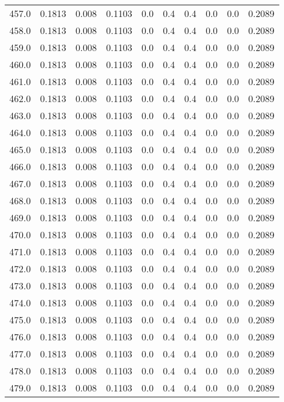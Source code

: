 \begin{longtable}{lrrrrrrrrr}
457.0 & 0.1813 & 0.008 & 0.1103 & 0.0 & 0.4 & 0.4 & 0.0 & 0.0 & 0.2089 \\
458.0 & 0.1813 & 0.008 & 0.1103 & 0.0 & 0.4 & 0.4 & 0.0 & 0.0 & 0.2089 \\
459.0 & 0.1813 & 0.008 & 0.1103 & 0.0 & 0.4 & 0.4 & 0.0 & 0.0 & 0.2089 \\
460.0 & 0.1813 & 0.008 & 0.1103 & 0.0 & 0.4 & 0.4 & 0.0 & 0.0 & 0.2089 \\
461.0 & 0.1813 & 0.008 & 0.1103 & 0.0 & 0.4 & 0.4 & 0.0 & 0.0 & 0.2089 \\
462.0 & 0.1813 & 0.008 & 0.1103 & 0.0 & 0.4 & 0.4 & 0.0 & 0.0 & 0.2089 \\
463.0 & 0.1813 & 0.008 & 0.1103 & 0.0 & 0.4 & 0.4 & 0.0 & 0.0 & 0.2089 \\
464.0 & 0.1813 & 0.008 & 0.1103 & 0.0 & 0.4 & 0.4 & 0.0 & 0.0 & 0.2089 \\
465.0 & 0.1813 & 0.008 & 0.1103 & 0.0 & 0.4 & 0.4 & 0.0 & 0.0 & 0.2089 \\
466.0 & 0.1813 & 0.008 & 0.1103 & 0.0 & 0.4 & 0.4 & 0.0 & 0.0 & 0.2089 \\
467.0 & 0.1813 & 0.008 & 0.1103 & 0.0 & 0.4 & 0.4 & 0.0 & 0.0 & 0.2089 \\
468.0 & 0.1813 & 0.008 & 0.1103 & 0.0 & 0.4 & 0.4 & 0.0 & 0.0 & 0.2089 \\
469.0 & 0.1813 & 0.008 & 0.1103 & 0.0 & 0.4 & 0.4 & 0.0 & 0.0 & 0.2089 \\
470.0 & 0.1813 & 0.008 & 0.1103 & 0.0 & 0.4 & 0.4 & 0.0 & 0.0 & 0.2089 \\
471.0 & 0.1813 & 0.008 & 0.1103 & 0.0 & 0.4 & 0.4 & 0.0 & 0.0 & 0.2089 \\
472.0 & 0.1813 & 0.008 & 0.1103 & 0.0 & 0.4 & 0.4 & 0.0 & 0.0 & 0.2089 \\
473.0 & 0.1813 & 0.008 & 0.1103 & 0.0 & 0.4 & 0.4 & 0.0 & 0.0 & 0.2089 \\
474.0 & 0.1813 & 0.008 & 0.1103 & 0.0 & 0.4 & 0.4 & 0.0 & 0.0 & 0.2089 \\
475.0 & 0.1813 & 0.008 & 0.1103 & 0.0 & 0.4 & 0.4 & 0.0 & 0.0 & 0.2089 \\
476.0 & 0.1813 & 0.008 & 0.1103 & 0.0 & 0.4 & 0.4 & 0.0 & 0.0 & 0.2089 \\
477.0 & 0.1813 & 0.008 & 0.1103 & 0.0 & 0.4 & 0.4 & 0.0 & 0.0 & 0.2089 \\
478.0 & 0.1813 & 0.008 & 0.1103 & 0.0 & 0.4 & 0.4 & 0.0 & 0.0 & 0.2089 \\
479.0 & 0.1813 & 0.008 & 0.1103 & 0.0 & 0.4 & 0.4 & 0.0 & 0.0 & 0.2089 \\

\end{longtable}
